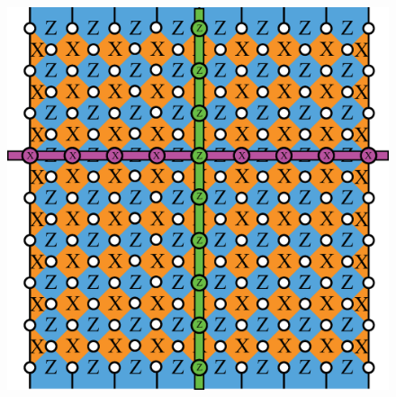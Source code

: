 \documentclass[a4paper,11pt]{ltjsarticle}
\begin{document}
{{        \begin{figure}[h]
            \centering
            \includegraphics[scale=0.40]{figure/logical_operator_planar.eps}
            \vspace{0pt}\caption{}
            \label{logical_operator_planar}
            \vspace{-10pt}
        \end{figure}



        
    }
}
\end{document}
